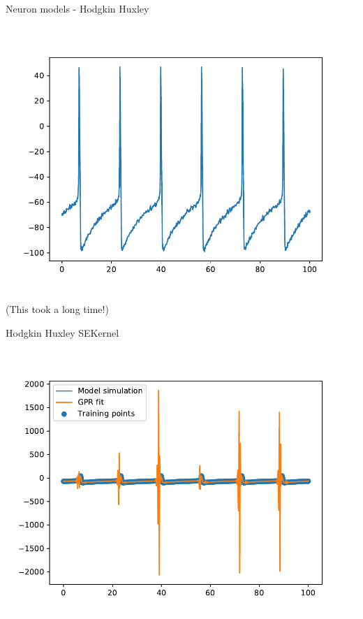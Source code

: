 \documentclass[presentation]{beamer}
\begin{document}
\begin{frame}[plain,label={sec:org67a6722}]{Neuron models - Hodgkin Huxley}
\begin{center}
\includegraphics[width=\textwidth]{./noisy_HH.pdf}
\end{center}

(This took a long time!)
\end{frame}

\begin{frame}[plain,label={sec:orgc73c4d1}]{Hodgkin Huxley SEKernel}
\begin{center}
\includegraphics[width=\textwidth]{./HH_SEKernel.pdf}
\end{center}
\end{frame}
\end{document}
